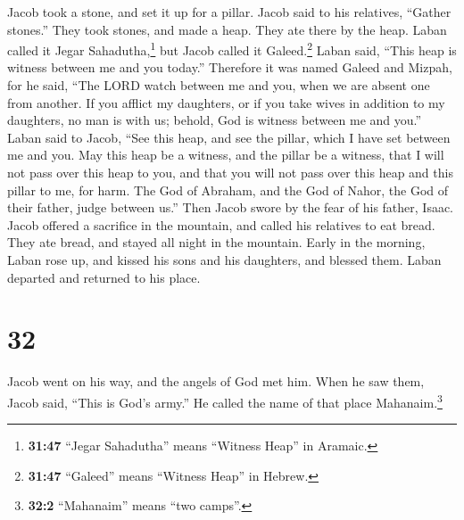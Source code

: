  Jacob took a stone, and set it up for a pillar.
 Jacob said to his relatives, ``Gather stones.'' They
took stones, and made a heap. They ate there by the heap.
 Laban called it Jegar Sahadutha,\footnote{\textbf{31:47}
  ``Jegar Sahadutha'' means ``Witness Heap'' in Aramaic.} but Jacob
called it Galeed.\footnote{\textbf{31:47} ``Galeed'' means ``Witness
  Heap'' in Hebrew.}  Laban said, ``This heap is witness
between me and you today.'' Therefore it was named Galeed
 and Mizpah, for he said, ``The LORD watch between me and
you, when we are absent one from another.  If you afflict
my daughters, or if you take wives in addition to my daughters, no man
is with us; behold, God is witness between me and you.'' 
Laban said to Jacob, ``See this heap, and see the pillar, which I have
set between me and you.  May this heap be a witness, and
the pillar be a witness, that I will not pass over this heap to you, and
that you will not pass over this heap and this pillar to me, for harm.
 The God of Abraham, and the God of Nahor, the God of
their father, judge between us.'' Then Jacob swore by the fear of his
father, Isaac.  Jacob offered a sacrifice in the
mountain, and called his relatives to eat bread. They ate bread, and
stayed all night in the mountain.  Early in the morning,
Laban rose up, and kissed his sons and his daughters, and blessed them.
Laban departed and returned to his place.

\hypertarget{section-31}{%
\section{32}\label{section-31}}

 Jacob went on his way, and the angels of God met him.
 When he saw them, Jacob said, ``This is God's army.'' He
called the name of that place Mahanaim.\footnote{\textbf{32:2}
  ``Mahanaim'' means ``two camps''.}

